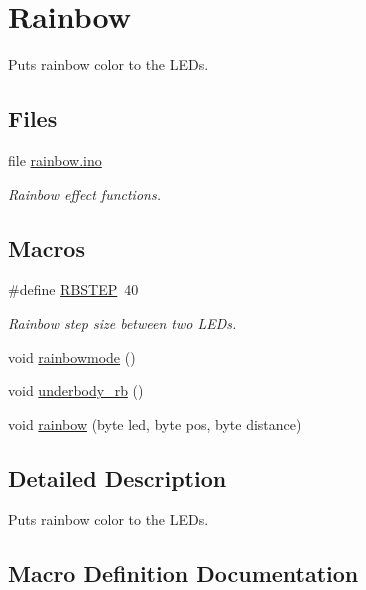 \hypertarget{group__rainbow}{}\section{Rainbow}
\label{group__rainbow}


Puts rainbow color to the L\+E\+Ds.  


\subsection*{Files}
\begin{DoxyCompactItemize}
\item 
file \hyperlink{rainbow_8ino}{rainbow.\+ino}
\begin{DoxyCompactList}\small\item\em Rainbow effect functions. \end{DoxyCompactList}\end{DoxyCompactItemize}
\subsection*{Macros}
\begin{DoxyCompactItemize}
\item 
\#define \hyperlink{group__rainbow_ga36ae3bd3da884ff03d7306f674f70dea}{R\+B\+S\+T\+EP}~40
\begin{DoxyCompactList}\small\item\em Rainbow step size between two L\+E\+Ds. \end{DoxyCompactList}\end{DoxyCompactItemize}
\begin{DoxyCompactItemize}
\item 
void \hyperlink{group__rainbow_ga51e30a1c423190e50127c6651c991612}{rainbowmode} ()
\item 
void \hyperlink{group__rainbow_ga3656f41cfe48a0bf63e63099673ac4c4}{underbody\+\_\+rb} ()
\item 
void \hyperlink{group__rainbow_ga80198b192c269a2b71cfa41654a3aafd}{rainbow} (byte led, byte pos, byte distance)
\end{DoxyCompactItemize}


\subsection{Detailed Description}
Puts rainbow color to the L\+E\+Ds. 



\subsection{Macro Definition Documentation}
